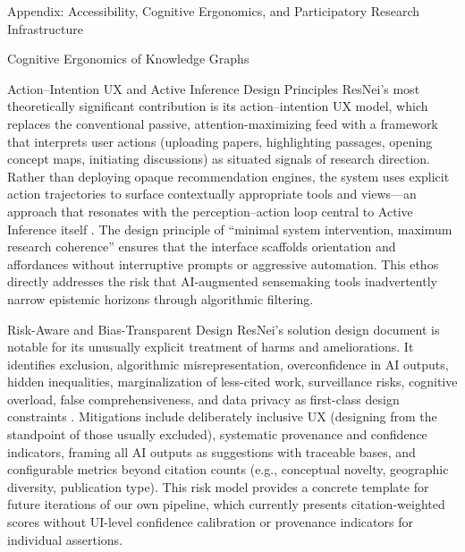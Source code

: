 \documentclass[
  ignorenonframetext,
]{beamer}
\begin{document}
\begin{frame}{Appendix: Accessibility, Cognitive Ergonomics, and
Participatory Research Infrastructure \label{sec:accessibility}}
\begin{block}{Cognitive Ergonomics of Knowledge Graphs}
\begin{block}{Action--Intention UX and Active Inference Design
Principles}
\protect{}\label{actionintention-ux-and-active-inference-design-principles}
ResNei's most theoretically significant contribution is its
action--intention UX model, which replaces the conventional passive,
attention-maximizing feed with a framework that interprets user actions
(uploading papers, highlighting passages, opening concept maps,
initiating discussions) as situated signals of research direction.
Rather than deploying opaque recommendation engines, the system uses
explicit action trajectories to surface contextually appropriate tools
and views---an approach that resonates with the perception--action loop
central to Active Inference itself \citep{parr2022active}. The design
principle of ``minimal system intervention, maximum research coherence''
ensures that the interface scaffolds orientation and affordances without
interruptive prompts or aggressive automation. This ethos directly
addresses the risk that AI-augmented sensemaking tools inadvertently
narrow epistemic horizons through algorithmic filtering.
\end{block}

\begin{block}{Risk-Aware and Bias-Transparent Design}
\protect{}\label{risk-aware-and-bias-transparent-design}
ResNei's solution design document is notable for its unusually explicit
treatment of harms and ameliorations. It identifies exclusion,
algorithmic misrepresentation, overconfidence in AI outputs, hidden
inequalities, marginalization of less-cited work, surveillance risks,
cognitive overload, false comprehensiveness, and data privacy as
first-class design constraints \citep{lumiruusu2025resnei}. Mitigations
include deliberately inclusive UX (designing from the standpoint of
those usually excluded), systematic provenance and confidence
indicators, framing all AI outputs as suggestions with traceable bases,
and configurable metrics beyond citation counts (e.g., conceptual
novelty, geographic diversity, publication type). This risk model
provides a concrete template for future iterations of our own pipeline,
which currently presents citation-weighted scores without UI-level
confidence calibration or provenance indicators for individual
assertions.
\end{block}
\end{block}


\end{frame}
\end{document}
